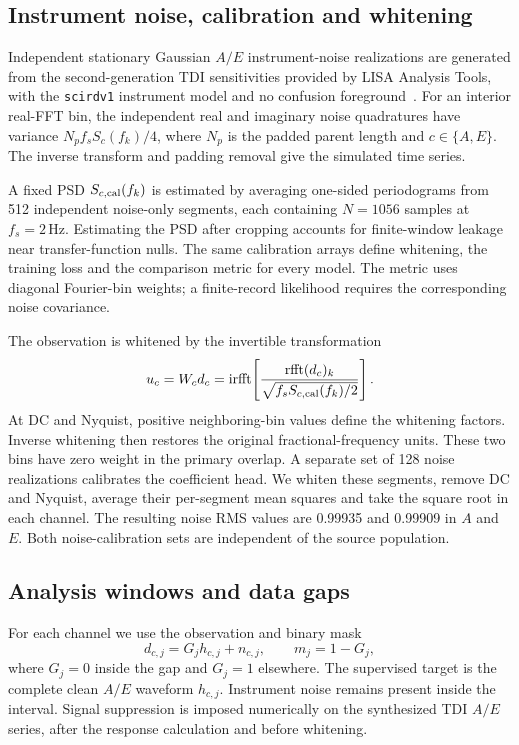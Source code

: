\documentclass[10pt,prd,aps,a4paper,twocolumn,superscriptaddress,nofootinbib,floatfix]{revtex4-2}
\begin{document}
\subsection{Instrument noise, calibration and whitening}\label{noise model}
Independent stationary Gaussian $A/E$ instrument-noise realizations are generated from the second-generation TDI sensitivities provided by LISA Analysis Tools, with the \texttt{scirdv1} instrument model and no confusion foreground~\cite{LISAAnalysisTools}. For an interior real-FFT bin, the independent real and imaginary noise quadratures have variance $N_p f_s S_c(f_k)/4$, where $N_p$ is the padded parent length and $c\in\{A,E\}$. The inverse transform and padding removal give the simulated time series.

A fixed PSD $S_{c,\rm cal}(f_k)$ is estimated by averaging one-sided periodograms from 512 independent noise-only segments, each containing $N=1056$ samples at $f_s=2\,\mathrm{Hz}$. Estimating the PSD after cropping accounts for finite-window leakage near transfer-function nulls. The same calibration arrays define whitening, the training loss and the comparison metric for every model. The metric uses diagonal Fourier-bin weights; a finite-record likelihood requires the corresponding noise covariance.

The observation is whitened by the invertible transformation
\begin{equation}
u_c=W_cd_c=\operatorname{irfft}\!\left[
\frac{\operatorname{rfft}(d_c)_k}{\sqrt{f_sS_{c,\rm cal}(f_k)/2}}\right].\label{eq:whitening}
\end{equation}
At DC and Nyquist, positive neighboring-bin values define the whitening factors. Inverse whitening then restores the original fractional-frequency units. These two bins have zero weight in the primary overlap. A separate set of 128 noise realizations calibrates the coefficient head. We whiten these segments, remove DC and Nyquist, average their per-segment mean squares and take the square root in each channel. The resulting noise RMS values are 0.99935 and 0.99909 in $A$ and $E$. Both noise-calibration sets are independent of the source population.

\subsection{Analysis windows and data gaps}\label{sec:gaps}
For each channel we use the observation and binary mask
\begin{equation}
d_{c,j}=G_jh_{c,j}+n_{c,j},\qquad m_j=1-G_j,\label{eq:observation}
\end{equation}
where $G_j=0$ inside the gap and $G_j=1$ elsewhere. The supervised target is the complete clean $A/E$ waveform $h_{c,j}$. Instrument noise remains present inside the interval. Signal suppression is imposed numerically on the synthesized TDI $A/E$ series, after the response calculation and before whitening.
\end{document}
